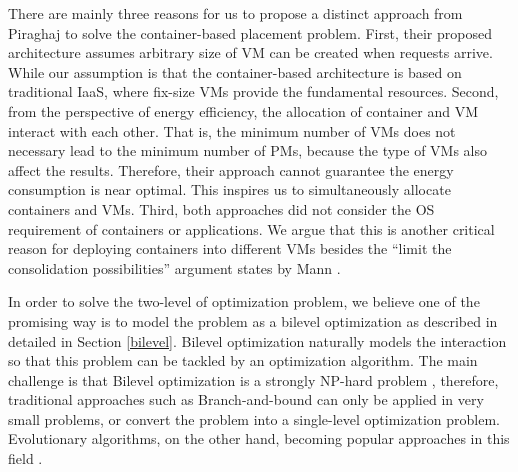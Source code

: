 There are mainly three reasons for us to propose a distinct approach from Piraghaj \cite{Piraghaj:2016bw} to solve the container-based placement problem. First, their proposed architecture assumes arbitrary size of VM can be created when requests arrive. While our assumption is that the container-based architecture is based on traditional IaaS, where fix-size VMs provide the fundamental resources. Second, from the perspective of energy efficiency, the allocation of container and VM interact with each other. That is, the minimum number of VMs does not necessary lead to the minimum number of PMs, because the type of VMs also affect the results. Therefore, their approach cannot guarantee the energy consumption is near optimal. This inspires us to simultaneously allocate containers and VMs. Third, both approaches did not consider the OS requirement of containers or applications. We argue that this is another critical reason for deploying containers into different VMs besides the ``limit the consolidation possibilities'' argument states by Mann \cite{Mann:2016hx}.

In order to solve the two-level of optimization problem, we believe one of the promising way is to model the problem as a bilevel optimization \cite{Colson:2007bu} as described in detailed in Section \ref{bilevel}. Bilevel optimization naturally models the interaction so that this problem can be tackled by an optimization algorithm. The main challenge is that Bilevel optimization is a strongly NP-hard problem \cite{:2013tn}, therefore, traditional approaches such as Branch-and-bound \cite{Bard:1982ud} can only be applied in very small problems, or convert the problem into a single-level optimization problem.  Evolutionary algorithms, on the other hand, becoming popular approaches in this field \cite{Wang:2005fa, Sinha:2013tn}. 



